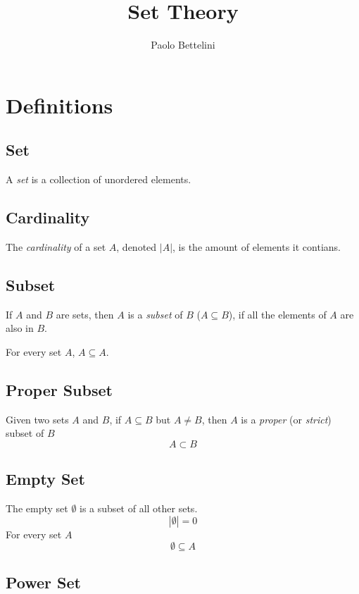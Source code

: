 \documentclass{article}
\title{Set Theory}
\author{Paolo Bettelini}
\date{}
\begin{document}
\maketitle
\tableofcontents
\pagebreak


\section{Definitions}

\subsection{Set}

A \textit{set} is a collection of unordered elements.

\subsection{Cardinality}

The \textit{cardinality} of a set \(A\), denoted \(|A|\),
is the amount of elements it contians.

\subsection{Subset}

If \(A\) and \(B\) are sets, then \(A\) is a \textit{subset} of \(B\)
(\(A\subseteq B\)), if all the elements of \(A\) are also in \(B\).

For every set \(A\), \(A \subseteq A\).

\subsection{Proper Subset}

Given two sets \(A\) and \(B\), if \(A \subseteq B\) but \(A \neq B\),
then \(A\) is a \textit{proper} (or \textit{strict}) subset of \(B\)
\[
    A \subset B
\]

\subsection{Empty Set}

The empty set \(\emptyset\) is a subset of all other sets.
\[
    |\emptyset|=0
\]
For every set \(A\)
\[
    \emptyset \subseteq A
\]

\subsection{Power Set}
\end{document}
